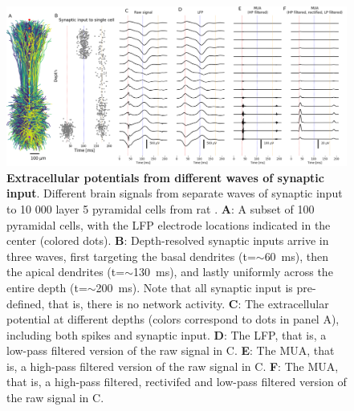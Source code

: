 \documentclass[preprint,11pt,authoryear]{elsarticle}
\begin{document}
\begin{figure}[!ht]
\begin{center}
\includegraphics[width=1\textwidth]{population_LFP_MUA.png}
\end{center}
\caption{\textbf{Extracellular potentials from different waves of synaptic input}. Different brain signals from separate waves of synaptic input to 10 000 layer 5 pyramidal cells from rat \citep{Hay2011}.
{\bf A}: A subset of 100 pyramidal cells, with the LFP electrode locations indicated in the center (colored dots).
{\bf B}: Depth-resolved synaptic inputs arrive in three waves, first targeting the basal dendrites (t=$\sim$60~ms), then the apical dendrites (t=$\sim$130~ms), and lastly uniformly across the entire depth (t=$\sim$200~ms). Note that all synaptic input is pre-defined, that is, there is no network activity.
{\bf C}: The extracellular potential at different depths (colors correspond to dots in panel A), including both spikes and synaptic input.
{\bf D}: The LFP, that is, a low-pass filtered version of the raw signal in C.
{\bf E}: The MUA, that is, a high-pass filtered version of the raw signal in C.
{\bf F}: The MUA, that is, a high-pass filtered, rectivifed and low-pass filtered version of the raw signal in C.
}
\label{fig:LFP_MUA}
\end{figure}
\end{document}
